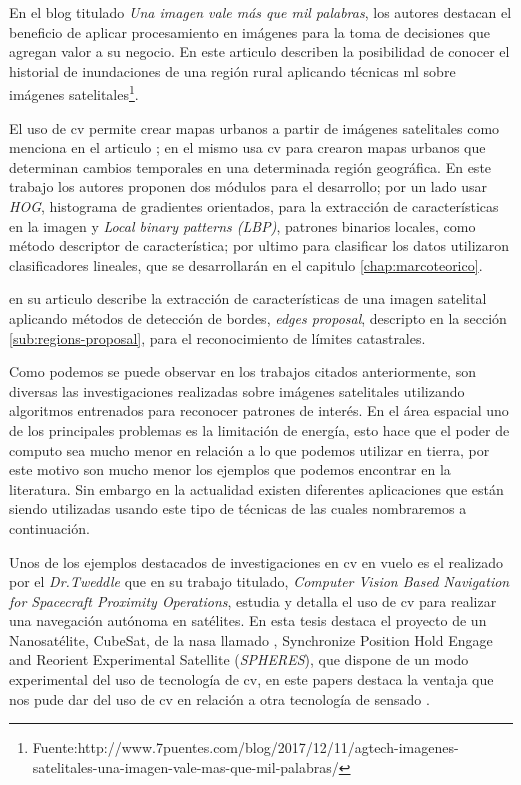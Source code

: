 En el blog titulado \textit{Una imagen vale más que mil palabras}, los autores destacan el beneficio de aplicar procesamiento en imágenes para la toma de decisiones que agregan valor a su negocio. En este articulo describen la posibilidad de conocer el historial de inundaciones de una región rural aplicando técnicas \ac{ml} sobre imágenes satelitales\footnote{Fuente:http://www.7puentes.com/blog/2017/12/11/agtech-imagenes-satelitales-una-imagen-vale-mas-que-mil-palabras/}.

El uso de \ac{cv} permite crear mapas urbanos a partir de imágenes satelitales como menciona en el articulo \citep{detectionHOG}; en el mismo usa \ac{cv} para crearon mapas urbanos que determinan cambios temporales en una determinada región geográfica. En este trabajo los autores proponen dos módulos para el desarrollo; por un lado usar \textit{HOG}, histograma de gradientes orientados, para la extracción de características en la imagen y \textit{Local binary patterns (LBP)}, patrones binarios locales, como método descriptor de característica; por ultimo para clasificar los datos utilizaron clasificadores lineales, que se desarrollarán en el capitulo \ref{chap:marcoteorico}. 

\cite{usman} en su articulo describe la extracción de características de una imagen satelital aplicando métodos de  detección de bordes, \textit{edges proposal}, descripto en la sección \ref{sub:regions-proposal}, para el reconocimiento de límites catastrales.

Como podemos se puede observar en los trabajos citados anteriormente, son diversas las investigaciones realizadas sobre imágenes satelitales utilizando algoritmos entrenados para reconocer patrones de interés. En el área espacial uno de los principales problemas es la limitación de energía, esto hace que el poder de computo sea mucho menor en relación a lo que podemos utilizar en tierra, por este motivo son mucho menor los ejemplos que podemos encontrar en la literatura. Sin embargo en la actualidad existen diferentes aplicaciones que están siendo utilizadas usando este tipo de técnicas de las cuales nombraremos a continuación.

Unos de los ejemplos destacados de investigaciones en \ac{cv} en vuelo es el realizado por el \textit{Dr.Tweddle} que en su trabajo titulado, \textit{Computer Vision Based Navigation for Spacecraft Proximity Operations}, estudia y detalla el uso de \ac{cv} para realizar una navegación autónoma en satélites. En esta tesis destaca el proyecto de un Nanosatélite, CubeSat, de la \ac{nasa} llamado , Synchronize Position Hold Engage and Reorient Experimental Satellite (\textit{SPHERES}), que dispone de un modo experimental del uso de tecnología de \ac{cv}, en este papers destaca la ventaja que nos pude dar del uso de \ac{cv} en relación a otra tecnología de sensado \citep{Brent}.

